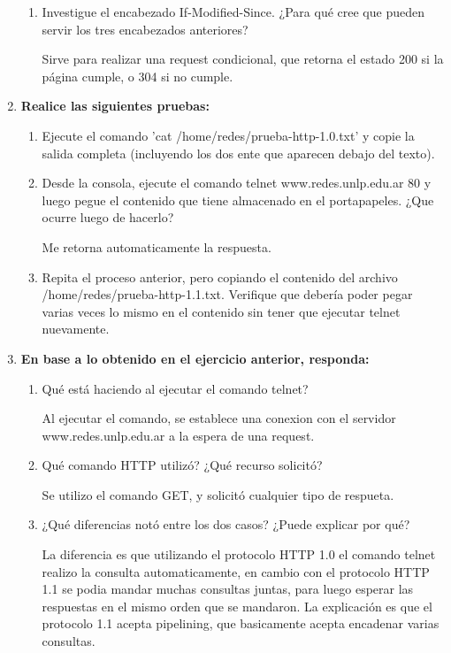 \documentclass[a4paper,10pt]{article}
\begin{document}
\begin{enumerate}
\begin{enumerate}
            \item Investigue el encabezado If-Modified-Since. ¿Para qué cree que pueden servir los tres encabezados anteriores?

            Sirve para realizar una request condicional, que retorna el estado 200 si la página cumple, o 304 si no cumple.
        \end{enumerate}

    \item \textbf{Realice las siguientes pruebas:}

        \begin{enumerate}
            \item Ejecute el comando 'cat /home/redes/prueba-http-1.0.txt' y copie la salida completa (incluyendo los dos ente que aparecen debajo del texto).

            \item Desde la consola, ejecute el comando telnet www.redes.unlp.edu.ar 80 y luego pegue el contenido que tiene almacenado en el portapapeles. ¿Que ocurre luego de hacerlo?

            Me retorna automaticamente la respuesta.

            \item Repita el proceso anterior, pero copiando el contenido del archivo  /home/redes/prueba-http-1.1.txt. Verifique que debería poder pegar varias veces lo mismo en el contenido sin tener que ejecutar telnet nuevamente.
        \end{enumerate}

    \item \textbf{En base a lo obtenido en el ejercicio anterior, responda:}

        \begin{enumerate}
            \item Qué está haciendo al ejecutar el comando telnet?

            Al ejecutar el comando, se establece una conexion con el servidor www.redes.unlp.edu.ar a la espera de una request.

            \item Qué comando HTTP utilizó? ¿Qué recurso solicitó?

            Se utilizo el comando GET, y solicitó cualquier tipo de respueta.

            \item  ¿Qué diferencias notó entre los dos casos? ¿Puede explicar por qué?

            La diferencia es que utilizando el protocolo HTTP 1.0 el comando telnet realizo la consulta automaticamente, en cambio con el protocolo HTTP 1.1 se podia mandar muchas consultas juntas, para luego esperar las respuestas en el mismo orden que se mandaron. La explicación es que el protocolo 1.1 acepta pipelining, que basicamente acepta encadenar varias consultas.


\end{enumerate}
\end{enumerate}
\end{document}
